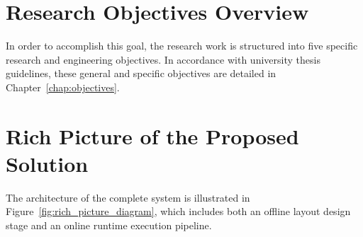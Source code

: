 \section{Research Objectives Overview}
\label{sec:research_text_objectives}
In order to accomplish this goal, the research work is structured into five specific research and engineering objectives. In accordance with university thesis guidelines, these general and specific objectives are detailed in Chapter~\ref{chap:objectives}.

\section{Rich Picture of the Proposed Solution}
\label{sec:rich_picture}
The architecture of the complete system is illustrated in Figure~\ref{fig:rich_picture_diagram}, which includes both an offline layout design stage and an online runtime execution pipeline.

